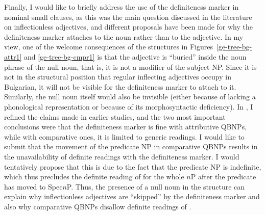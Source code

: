 \documentclass[output=paper]{langscibook}
\begin{document}
Finally, I would like to briefly address the use of the definiteness marker in nominal small clauses, as this was the main question discussed in the literature on inflectionless adjectives, and different proposals have been made for why the definiteness marker attaches to the noun rather than to the adjective. In my view, one of the welcome consequences of the structures in Figures~\ref{ge-tree-bg-attr1} and \ref{ge-tree-bg-cmpr1} is that the adjective is ``buried'' inside the noun phrase of the null noun, that is, it is not a modifier of the subject NP. Since it is not in the structural position that regular inflecting adjectives occupy in Bulgarian, it will not be visible for the definiteness marker to attach to it. Similarly, the null noun itself would also be invisible (either because of lacking a phonological representation or because of its morphosyntactic deficiency). In , I refined the claims made in earlier studies, and the two most important conclusions were that the definiteness marker is fine with attributive QBNPs, while with comparative ones, it is limited to generic readings.%
I would like to submit that the movement of the predicate NP in comparative QBNPs results in the unavailability of definite readings with the definiteness marker. I would tentatively propose that this is due to the fact that the predicate NP is indefinite, which thus precludes the definite reading of \Def{} for the whole $n$P after the predicate has moved to Spec$n$P. Thus, the presence of a null noun in the structure can explain why inflectionless adjectives are ``skipped'' by the definiteness marker and also why comparative QBNPs disallow definite readings of \Def{}.
\end{document}
